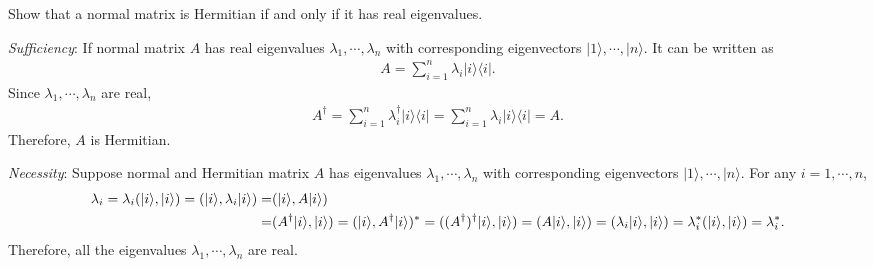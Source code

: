 \documentclass[en]{sol-man}
\begin{document}
\begin{exe}
    Show that a normal matrix is Hermitian if and only if it has real eigenvalues.
\end{exe}
\begin{pf}
    \emph{Sufficiency}: If normal matrix $A$ has real eigenvalues $\lambda_1,\cdots,\lambda_n$ with corresponding eigenvectors $\lvert 1\rangle,\cdots,\lvert n\rangle$. It can be written as
    \begin{align}
        A=\sum_{i=1}^n\lambda_i\lvert i\rangle\langle i\rvert.
    \end{align}
    Since $\lambda_1,\cdots,\lambda_n$ are real,
    \begin{align}
        A^{\dagger}=\sum_{i=1}^n\lambda_i^{\dagger}\lvert i\rangle\langle i\rvert=\sum_{i=1}^n\lambda_i\lvert i\rangle\langle i\rvert=A.
    \end{align}
    Therefore, $A$ is Hermitian.

    \emph{Necessity}: Suppose normal and Hermitian matrix $A$ has eigenvalues $\lambda_1,\cdots,\lambda_n$ with corresponding eigenvectors $\lvert 1\rangle,\cdots,\lvert n\rangle$. For any $i=1,\cdots,n$,
    \begin{align}
        \notag\lambda_i=\lambda_i(\lvert i\rangle,\lvert i\rangle)=(\lvert i\rangle,\lambda_i\lvert i\rangle)=&(\lvert i\rangle,A\lvert i\rangle)\\
        =&(A^{\dagger}\lvert i\rangle,\lvert i\rangle)=(\lvert i\rangle,A^{\dagger}\lvert i\rangle)^*=((A^{\dagger})^{\dagger}\lvert i\rangle,\lvert i\rangle)=(A\lvert i\rangle,\lvert i\rangle)=(\lambda_i\lvert i\rangle,\lvert i\rangle)=\lambda_i^*(\lvert i\rangle,\lvert i\rangle)=\lambda_i^*.
    \end{align}
    Therefore, all the eigenvalues $\lambda_1,\cdots,\lambda_n$ are real.
\end{pf}
\end{document}
